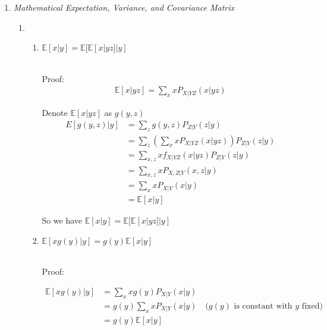 \documentclass[a4paper]{article}
\begin{document}

\begin{enumerate}
  \setlength{\itemsep}{3\parskip}

    \item \textit{Mathematical Expectation, Variance, and Covariance Matrix}
    \begin{enumerate}
      \item \begin{enumerate}
        \item $\mathbb{E}[x| y]=\mathbb{E}[\mathbb{E}[x | yz] |y]$
        \\~ 
        
        Proof: 
        \begin{equation}
          \begin{aligned}
            \mathbb{E} [x|yz] = \sum_{x} xP_{X|YZ}(x|yz)
          \end{aligned}
        \end{equation}

        Denote $ \mathbb{E} [x|yz]$ as $g(y,z)$
        \begin{equation}
          \begin{aligned}
            E[g(y,z) | y] &= \sum_{z} g(y,z) P_{Z|Y}(z|y) \\
            & = \sum_{z} \left(\sum_{x} xP_{X|YZ}(x|yz)\right)P_{Z|Y}(z|y) \\
            & = \sum_{x,z} xf_{X|YZ}(x|yz) P_{Z|Y}(z|y) \\
            & = \sum_{x,z} x P_{X,Z|Y}(x,z|y) \\
            & = \sum_{x} x P_{X|Y}(x|y) \\ 
            & = \mathbb{E}[x| y]
          \end{aligned}
        \end{equation}

        So we have $\mathbb{E}[x| y]=\mathbb{E}[\mathbb{E}[x | yz] |y]$

      \item $\mathbb{E}[xg(y) |y] = g(y)\mathbb{E}[x| y]$
      \\~

      Proof:

      \begin{equation}\label{eq3}
        \begin{aligned}
          \mathbb{E}[xg(y) |y]& = \sum_{x} xg(y) P_{X|Y}(x|y) \\
          & = g(y)\sum_{x} x P_{X|Y}(x|y) \quad (g(y) \text{ is constant with } y \text{ fixed)}\\
          & = g(y) \mathbb{E} [x|y]
        \end{aligned}
      \end{equation}


\end{enumerate}
\end{enumerate}
\end{enumerate}
\end{document}
